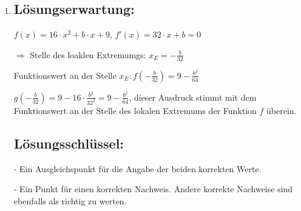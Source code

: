 \begin{langesbeispiel}
{\begin{enumerate}
	\item \subsection{Lösungserwartung:}
	
	$f(x)=16\cdot x^2+b\cdot x+9$, $f'(x)=32\cdot x+b=0$
	
	$\Rightarrow$ Stelle des loaklen Extremumgs: $x_E=-\frac{b}{32}$
	
	Funktionswert an der Stelle $x_E:f\left(-\frac{b}{32}\right)=9-\frac{b^2}{64}$
	
	$g\left(-\frac{b}{32}\right)=9-16\cdot\frac{b^2}{32^2}=9-\frac{b^2}{64}$, dieser Ausdruck stimmt mit dem Funktionswert an der Stelle des lokalen Extremums der Funktion $f$ überein.
	
	\subsection{Lösungsschlüssel:}
	
	- Ein Ausgleichspunkt für die Angabe der beiden korrekten Werte.
	
	- Ein Punkt für einen korrekten Nachweis. Andere korrekte Nachweise sind ebenfalls als richtig zu werten.
		\end{enumerate}}		
	
		\end{langesbeispiel}